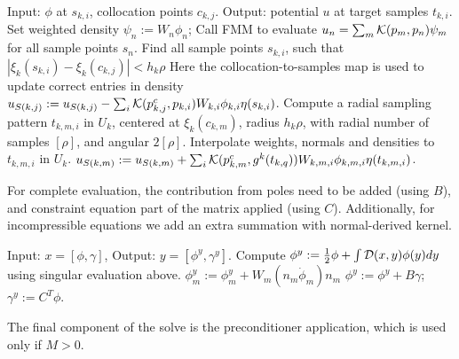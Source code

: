 \documentclass[10pt]{article}
\newcommand{\cD}{{\cal D}}
\newcommand{\cK}{{\cal K}}
\begin{document}
\begin{algorithmic}
\STATE {}
\STATE Input: $\phi$ at $s_{k,i}$, collocation points $c_{k,j}$.  Output: potential $u$ at target samples $t_{k,i}$. 
\STATE {}
\STATE Set weighted density $\psi_n := W_n \phi_n$;
\STATE Call FMM to evaluate $u_n = \sum_m \cK(p_m,p_n)\psi_m$ for all sample points $s_n$.
\STATE Find all sample points $s_{k,i}$, such that  $|\xi_k(s_{k,i})- \xi_k(c_{k,j})| < h_k\rho$
\STATE  Here the collocation-to-samples map is used to update correct entries in density 
\STATE $ u_{S(k,j)} := u_{S(k,j)} - \sum_i \cK(p^c_{k,j},p_{k,i}) W_{k,i} \phi_{k,i} \eta(s_{k,i})$.
\ENDFOR
\ENDFOR
\STATE {}
\STATE Compute a radial sampling pattern $t_{k,m,i}$  in $U_k$, centered at
$\xi_k(c_{k,m})$, radius $h_k \rho$, with radial number of samples
$[\rho]$, and angular $2[\rho]$.
\STATE Interpolate weights, normals and densities to $t_{k,m,i}$ in $U_k$.
\STATE $u_{S(k,m)} := u_{S(k,m)} + \sum_i \cK(p^c_{k,m},g^k(t_{k,q})) W_{k,m,i} \phi_{k,m,i} \eta(t_{k,m,i})$.
\ENDFOR
\ENDFOR
\end{algorithmic}

For complete evaluation, the contribution from poles  need to be          
added (using $B$), and constraint equation part of the matrix
applied (using $C$). Additionally, for incompressible equations we add an extra
summation with normal-derived kernel.

\newpage
											
\begin{algorithmic}
\STATE{}
\STATE{}
\STATE Input: $x = [\phi, \gamma]$,  Output: $y= [\phi^y, \gamma^y]$.
\STATE Compute $\phi^y := \frac{1}{2}\phi + \int \cD(x,y) \phi(y) dy $ using singular evaluation above. 
\STATE $\phi^y_m :=\phi^y_m+  W_m (n_m \dot \phi_m)n_m$
\ENDIF
{}
\STATE $\phi^y := \phi^y + B\gamma$; $\gamma^y := C^T\phi$.
\ENDIF
\end{algorithmic}

The final component of the solve is the preconditioner application,
which is used only if $M > 0$. 
\end{document}

